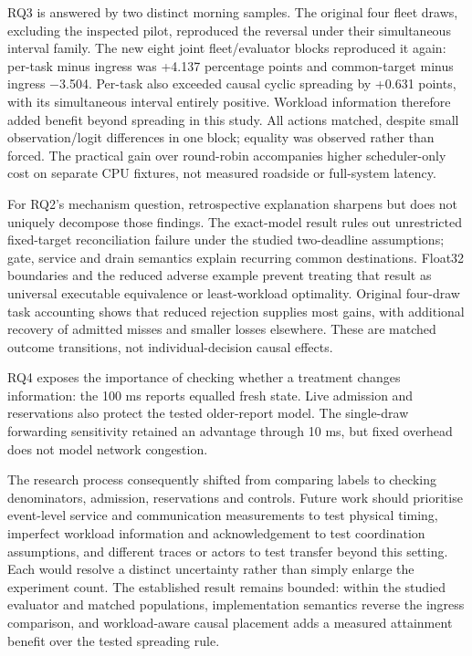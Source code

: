 \documentclass[11pt,a4paper]{article}
\begin{document}
RQ3 is answered by two distinct morning samples. The original four fleet draws, excluding the inspected pilot, reproduced the reversal under their simultaneous interval family. The new eight joint fleet/evaluator blocks reproduced it again: per-task minus ingress was +4.137 percentage points and common-target minus ingress \ensuremath{-}3.504. Per-task also exceeded causal cyclic spreading by +0.631 points, with its simultaneous interval entirely positive. Workload information therefore added benefit beyond spreading in this study. All actions matched, despite small observation/logit differences in one block; equality was observed rather than forced. The practical gain over round-robin accompanies higher scheduler-only cost on separate CPU fixtures, not measured roadside or full-system latency.

For RQ2's mechanism question, retrospective explanation sharpens but does not uniquely decompose those findings. The exact-model result rules out unrestricted fixed-target reconciliation failure under the studied two-deadline assumptions; gate, service and drain semantics explain recurring common destinations. Float32 boundaries and the reduced adverse example prevent treating that result as universal executable equivalence or least-workload optimality. Original four-draw task accounting shows that reduced rejection supplies most gains, with additional recovery of admitted misses and smaller losses elsewhere. These are matched outcome transitions, not individual-decision causal effects.

RQ4 exposes the importance of checking whether a treatment changes information: the 100 ms reports equalled fresh state. Live admission and reservations also protect the tested older-report model. The single-draw forwarding sensitivity retained an advantage through 10 ms, but fixed overhead does not model network congestion.

The research process consequently shifted from comparing labels to checking denominators, admission, reservations and controls. Future work should prioritise event-level service and communication measurements to test physical timing, imperfect workload information and acknowledgement to test coordination assumptions, and different traces or actors to test transfer beyond this setting. Each would resolve a distinct uncertainty rather than simply enlarge the experiment count. The established result remains bounded: within the studied evaluator and matched populations, implementation semantics reverse the ingress comparison, and workload-aware causal placement adds a measured attainment benefit over the tested spreading rule.
\end{document}
